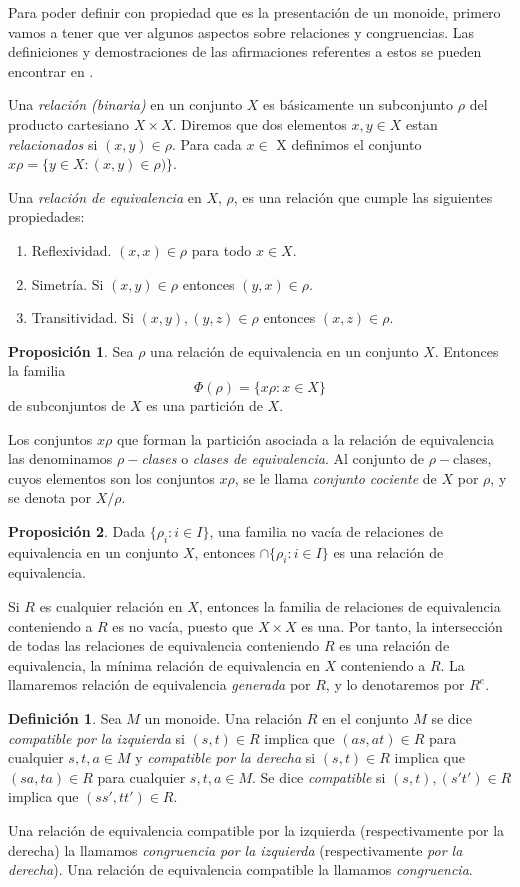 \documentclass[12pt]{book}
\theoremstyle{definition}
\newtheorem{defi}{Definición}[section]
\newtheorem{prop}{Proposición}[section]
\begin{document}
Para poder definir con propiedad que es la presentación de un monoide, primero vamos a tener que ver algunos aspectos sobre relaciones y congruencias. Las definiciones y demostraciones de las afirmaciones referentes a estos se pueden encontrar en \cite{monoides}.

Una \textit{relación (binaria)} en un conjunto $X$ es básicamente un subconjunto $\rho$ del producto cartesiano $X\times X$. Diremos que dos elementos $x,y\in X$ estan \textit{relacionados} si $(x,y)\in\rho$. Para cada $x\in$ X
 definimos el conjunto $x\rho=\{y\in X:(x,y)\in\rho)\}$.
 
Una \textit{relación de equivalencia} en $X$, $\rho$, es una relación que cumple las siguientes propiedades:
\begin{enumerate}
\item Reflexividad. $(x,x)\in\rho$ para todo $x\in X$.
\item Simetría. Si $(x,y)\in\rho$ entonces $(y,x)\in\rho$.
\item Transitividad. Si $(x,y),(y,z)\in\rho$ entonces $(x,z)\in\rho$.
\end{enumerate}

\begin{prop}
Sea $\rho$ una relación de equivalencia en un conjunto $X$. Entonces la familia
$$\Phi(\rho)=\{x\rho:x\in X\}$$
de subconjuntos de $X$ es una partición de $X$.
\end{prop}

Los conjuntos $x\rho$ que forman la partición asociada a la relación de equivalencia las denominamos $\rho-$\textit{clases} o \textit{clases de equivalencia}. Al conjunto de $\rho-$clases, cuyos elementos son los conjuntos $x\rho$, se le llama \textit{conjunto cociente} de $X$ por $\rho$, y se denota por $X/\rho$.
\begin{prop}
Dada $\{\rho_i:i\in I\}$, una familia no vacía de relaciones de equivalencia en un conjunto $X$, entonces $\cap\{\rho_i:i\in I\}$ es una relación de equivalencia.
\end{prop}
Si $R$ es cualquier relación en $X$, entonces la familia de relaciones de equivalencia conteniendo a $R$ es no vacía, puesto que $X\times X$ es una. Por tanto, la intersección de todas las relaciones de equivalencia conteniendo $R$ es una relación de equivalencia, la mínima relación de equivalencia en $X$ conteniendo a $R$. La llamaremos relación de equivalencia \textit{generada} por $R$, y lo denotaremos por $R^e$.

\begin{defi}
Sea $M$ un monoide. Una relación $R$ en el conjunto $M$ se dice \textit{compatible por la izquierda} si $(s,t)\in R$ implica que $(as,at)\in R$ para cualquier $s,t,a\in M$ y \textit{compatible por la derecha} si $(s,t)\in R$ implica que $(sa,ta)\in R$ para cualquier $s,t,a\in M$. Se dice \textit{compatible} si $(s,t),(s't')\in R$ implica que $(ss',tt')\in R$.

Una relación de equivalencia compatible por la izquierda (respectivamente por la derecha) la llamamos \textit{congruencia por la izquierda} (respectivamente \textit{por la derecha}). Una relación de equivalencia compatible la llamamos \textit{congruencia}.
\end{defi}
\end{document}
